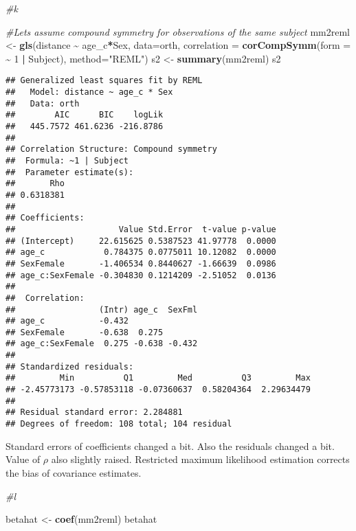 \documentclass[
]{article}
\newenvironment{Shaded}{\begin{snugshade}}{\end{snugshade}}
\newcommand{\AttributeTok}[1]{\textcolor[rgb]{0.13,0.29,0.53}{#1}}
\newcommand{\CommentTok}[1]{\textcolor[rgb]{0.56,0.35,0.01}{\textit{#1}}}
\newcommand{\DecValTok}[1]{\textcolor[rgb]{0.00,0.00,0.81}{#1}}
\newcommand{\FunctionTok}[1]{\textcolor[rgb]{0.13,0.29,0.53}{\textbf{#1}}}
\newcommand{\NormalTok}[1]{#1}
\newcommand{\OtherTok}[1]{\textcolor[rgb]{0.56,0.35,0.01}{#1}}
\newcommand{\SpecialCharTok}[1]{\textcolor[rgb]{0.81,0.36,0.00}{\textbf{#1}}}
\newcommand{\StringTok}[1]{\textcolor[rgb]{0.31,0.60,0.02}{#1}}
\begin{document}
\begin{Shaded}
\begin{Highlighting}[]
\CommentTok{\#k}

\CommentTok{\#Let\textquotesingle{}s assume compound symmetry for observations of the same subject}
\NormalTok{mm2reml }\OtherTok{\textless{}{-}} \FunctionTok{gls}\NormalTok{(distance }\SpecialCharTok{\textasciitilde{}}\NormalTok{ age\_c}\SpecialCharTok{*}\NormalTok{Sex, }\AttributeTok{data=}\NormalTok{orth,}
           \AttributeTok{correlation =} \FunctionTok{corCompSymm}\NormalTok{(}\AttributeTok{form =} \SpecialCharTok{\textasciitilde{}} \DecValTok{1} \SpecialCharTok{|}\NormalTok{ Subject),}
           \AttributeTok{method=}\StringTok{"REML"}\NormalTok{)}
\NormalTok{s2 }\OtherTok{\textless{}{-}} \FunctionTok{summary}\NormalTok{(mm2reml)}
\NormalTok{s2}
\end{Highlighting}
\end{Shaded}

\begin{verbatim}
## Generalized least squares fit by REML
##   Model: distance ~ age_c * Sex 
##   Data: orth 
##        AIC      BIC    logLik
##   445.7572 461.6236 -216.8786
## 
## Correlation Structure: Compound symmetry
##  Formula: ~1 | Subject 
##  Parameter estimate(s):
##       Rho 
## 0.6318381 
## 
## Coefficients:
##                     Value Std.Error  t-value p-value
## (Intercept)     22.615625 0.5387523 41.97778  0.0000
## age_c            0.784375 0.0775011 10.12082  0.0000
## SexFemale       -1.406534 0.8440627 -1.66639  0.0986
## age_c:SexFemale -0.304830 0.1214209 -2.51052  0.0136
## 
##  Correlation: 
##                 (Intr) age_c  SexFml
## age_c           -0.432              
## SexFemale       -0.638  0.275       
## age_c:SexFemale  0.275 -0.638 -0.432
## 
## Standardized residuals:
##         Min          Q1         Med          Q3         Max 
## -2.45773173 -0.57853118 -0.07360637  0.58204364  2.29634479 
## 
## Residual standard error: 2.284881 
## Degrees of freedom: 108 total; 104 residual
\end{verbatim}

Standard errors of coefficients changed a bit. Also the residuals
changed a bit. Value of \(\rho\) also slightly raised. Restricted
maximum likelihood estimation corrects the bias of covariance estimates.

\begin{Shaded}
\begin{Highlighting}[]
\CommentTok{\#l}

\NormalTok{betahat }\OtherTok{\textless{}{-}} \FunctionTok{coef}\NormalTok{(mm2reml)}
\NormalTok{betahat}
\end{Highlighting}
\end{Shaded}
\end{document}
